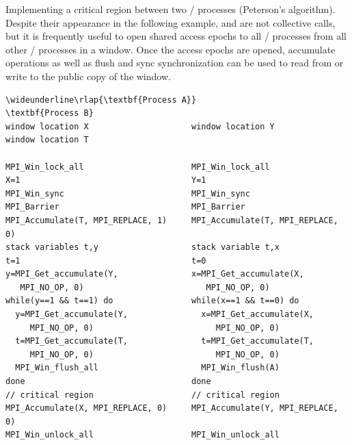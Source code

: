\begin{example}
%
Implementing a critical region between two \mpi/ processes (Peterson's
algorithm).  Despite their appearance in the
following example,  and
 are not collective calls, but it is
frequently useful to open shared access epochs to all \mpi/ processes from
all other \mpi/ processes in a window.  Once the access epochs are
opened, accumulate operations as well as flush and sync
synchronization can be used to read from or write to the
public copy of the window.
\begin{Verbatim}[commandchars=\\\{\}]
\wideunderline\rlap{\textbf{Process A}}                                      \textbf{Process B}
window location X                     window location Y
window location T

MPI_Win_lock_all                      MPI_Win_lock_all
X=1                                   Y=1
MPI_Win_sync                          MPI_Win_sync
MPI_Barrier                           MPI_Barrier
MPI_Accumulate(T, MPI_REPLACE, 1)     MPI_Accumulate(T, MPI_REPLACE, 0)
stack variables t,y                   stack variable t,x
t=1                                   t=0
y=MPI_Get_accumulate(Y,               x=MPI_Get_accumulate(X,
   MPI_NO_OP, 0)                         MPI_NO_OP, 0)
while(y==1 && t==1) do                while(x==1 && t==0) do
  y=MPI_Get_accumulate(Y,               x=MPI_Get_accumulate(X,
     MPI_NO_OP, 0)                         MPI_NO_OP, 0)
  t=MPI_Get_accumulate(T,               t=MPI_Get_accumulate(T,
     MPI_NO_OP, 0)                         MPI_NO_OP, 0)
  MPI_Win_flush_all                     MPI_Win_flush(A)
done                                  done
// critical region                    // critical region
MPI_Accumulate(X, MPI_REPLACE, 0)     MPI_Accumulate(Y, MPI_REPLACE, 0)
MPI_Win_unlock_all                    MPI_Win_unlock_all
\end{Verbatim}
\lstset{fancyvrb=false}
\end{example}

